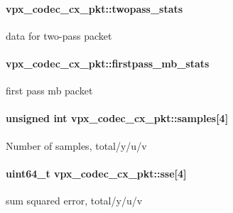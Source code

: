 \paragraph[{\texorpdfstring{twopass\+\_\+stats}{twopass_stats}}]{ vpx\+\_\+codec\+\_\+cx\+\_\+pkt\+::twopass\+\_\+stats}\hypertarget{structvpx__codec__cx__pkt_a4018900fa26ecc55abc4703cc7d7c7fc}{}\label{structvpx__codec__cx__pkt_a4018900fa26ecc55abc4703cc7d7c7fc}
data for two-\/pass packet 
\paragraph[{\texorpdfstring{firstpass\+\_\+mb\+\_\+stats}{firstpass_mb_stats}}]{ vpx\+\_\+codec\+\_\+cx\+\_\+pkt\+::firstpass\+\_\+mb\+\_\+stats}\hypertarget{structvpx__codec__cx__pkt_a81574398a8834c03d8d6911a682429fb}{}\label{structvpx__codec__cx__pkt_a81574398a8834c03d8d6911a682429fb}
first pass mb packet 
\paragraph[{\texorpdfstring{samples}{samples}}]{\setlength{\rightskip}{0pt plus 5cm}unsigned int vpx\+\_\+codec\+\_\+cx\+\_\+pkt\+::samples\mbox{[}4\mbox{]}}\hypertarget{structvpx__codec__cx__pkt_a4d3fc7eb2d19c5913c6f3f474e5cf77b}{}\label{structvpx__codec__cx__pkt_a4d3fc7eb2d19c5913c6f3f474e5cf77b}
Number of samples, total/y/u/v 
\paragraph[{\texorpdfstring{sse}{sse}}]{\setlength{\rightskip}{0pt plus 5cm}uint64\+\_\+t vpx\+\_\+codec\+\_\+cx\+\_\+pkt\+::sse\mbox{[}4\mbox{]}}\hypertarget{structvpx__codec__cx__pkt_ad65e918d3f26743cc7a8898b88bcb397}{}\label{structvpx__codec__cx__pkt_ad65e918d3f26743cc7a8898b88bcb397}
sum squared error, total/y/u/v 
